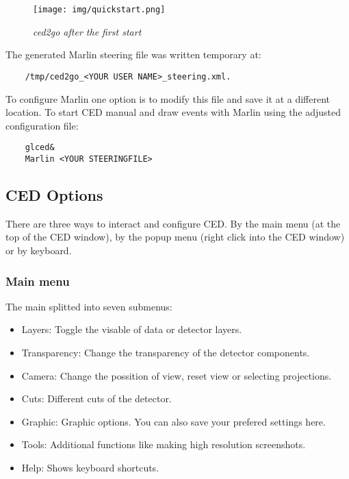 \documentclass[a4paper,10pt]{article}
\begin{document}
\begin{figure}
    \begin{center}
         \texttt{[image: img/quickstart.png]}
         \caption{\label{CEDViewer} \textsl{ced2go after the first start}}
    \end{center}
\end{figure}

The generated Marlin steering file was written temporary at:
\begin{verbatim}
    /tmp/ced2go_<YOUR USER NAME>_steering.xml.  
\end{verbatim}
To configure Marlin one option is to modify this file and save it at a different location. 
To start CED manual and draw events with Marlin using the adjusted configuration file:
\begin{verbatim}
    glced&
    Marlin <YOUR STEERINGFILE>
\end{verbatim}






\subsection{CED Options}
There are three ways to interact and configure CED. 
By the main menu (at the top of the CED window), by the popup menu (right click into the CED window) or by keyboard.



\subsubsection{Main menu}
The main splitted into seven submenus: 
\begin{itemize}
    \item{Layers}: Toggle the visable of data or detector layers. 
    \item{Transparency}: Change the transparency of the detector components. 
    \item{Camera}: Change the possition of view, reset view or selecting projections. 
    \item{Cuts}: Different cuts of the detector. 
    \item{Graphic}: Graphic options. You can also save your prefered settings here.
    \item{Tools}: Additional functions like making high resolution screenshots.
    \item{Help}: Shows keyboard shortcuts.
\end{itemize}
\end{document}
